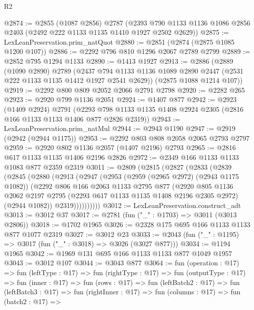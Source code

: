 \begin{lexlean}{R2}
\begin{coremodule}
@2874 := @2855
    (@1087 @2856)
    @2787
    (@2393 @790 @1133 @1136 @1086 @2856 @2403 (@2492 @222 @1133 @1135 @1410 @1927 @2502 @2629))
@2875 := LexLeanPreservation.prim_natQuot
@2880 := @2851 (@2874 (@2875 @1085 @1200 @107))
@2886 := @2292 @796 @810 @1296 @2067 @2789 @2799
@2889 := @2852 @795 @1294 @1133
@2890 := @1413 @1927
@2913 := @2886
    (@2889
      (@1090 @2890)
      @2789
      (@2437 @794 @1133 @1136 @1089 @2890 @2447 (@2531 @222 @1133 @1135 @1412 @1927 @2541 @2629))
      (@2875 @1088 @1214 @107))
@2919 := @2292 @800 @809 @2052 @2066 @2791 @2798
@2920 := @2282 @265
@2923 := @2920 @799 @1136 @2051
@2924 := @1407 @877
@2942 := @2923
    (@1409 @2924)
    @2791
    (@2293 @798 @1133 @1135 @1408 @2924 @2305 (@2816 @166 @1133 @1133 @1406 @877 @2826 @2319))
@2943 := LexLeanPreservation.prim_natMul
@2944 := @2943 @1190
@2947 := @2919 (@2942 (@2944 @1175))
@2953 := @2292 @803 @808 @2058 @2065 @2793 @2797
@2959 := @2920 @802 @1136 @2057 (@1407 @2196) @2793
@2965 := @2816 @617 @1133 @1135 @1406 @2196 @2826
@2972 := @2349 @166 @1133 @1133 @1083 @877 @2359 @2319
@3011 := @2809
    (@2815
      (@2827
        (@2833
          (@2839
            (@2845
              (@2880
                (@2913
                  (@2947
                    (@2953
                      (@2959 (@2965 @2972) (@2943 @1175 @1082))
                      (@2292
                        @806
                        @166
                        @2063
                        @1133
                        @2795
                        @877
                        (@2920
                          @805
                          @1136
                          @2062
                          @2197
                          @2795
                          (@2293 @617 @1133 @1135 @1408 @2196 @2305 @2972)
                          (@2944 @1082))
                        @2319))))))))))
@3012 := LexLeanPreservation.construct_adt
@3013 := @3012 @37
@3017 := @2781 (fun ("_" : @1703) => @3011 (@3013 @2806))
@3018 := @1702 @1965
@3026 := @2328 @175 @695 @166 @1133 @1133 @877 @1077 @2319
@3027 := @3012 @23
@3033 := @2043 (fun ("_" : @1195) => @3017 (fun ("_" : @3018) => @3026 (@3027 @877)))
@3034 := @1194 @1965
@3042 := @1969 @131 @695 @166 @1133 @1133 @877 @1049 @1957
@3043 := @3012 @107
@3044 := @3043 @877
@3064 := fun (operation : @17) =>
  fun (leftType : @17) =>
  fun (rightType : @17) =>
  fun (outputType : @17) =>
  fun (inner : @17) =>
  fun (rows : @17) =>
  fun (leftBatch2 : @17) =>
  fun (leftBatch3 : @17) =>
  fun (rightInner : @17) =>
  fun (columns : @17) =>
  fun (batch2 : @17) =>

\end{coremodule}
\end{lexlean}

